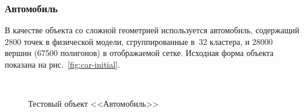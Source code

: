 \documentclass[a4paper, 14pt, titlepage]{extarticle}
\begin{document}
      \subsubsection{Автомобиль}

        В качестве объекта со сложной геометрией используется автомобиль, содержащий
        2800 точек в физической модели, сгруппированные в~32 кластера, и 28000 вершин (67500
        полигонов) в отображаемой сетке. Исходная форма объекта показана на рис.~\ref{fig:car-initial}.

        \begin{figure}[!htb]
          \centering
          \\
          \caption{Тестовый объект <<Автомобиль>>}
          \label{fig:car}
        \end{figure}
\end{document}
